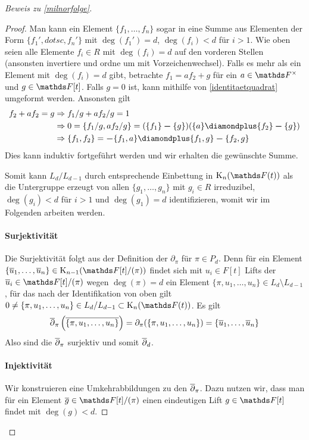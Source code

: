 \documentclass[ngerman,fontsize=11pt, paper=a4, parskip=half, titlepage=true, toc=bib]{scrartcl}
\begin{document}
\begin{proof}[Beweis zu \ref{milnorfolge}]
\begin{proof}
    Man kann ein Element $\{f_1,\dotsc,f_n\}$ sogar in eine Summe
    aus Elementen der Form $\{f_1',dotsc,f_n'\}$ mit $\deg(f_1')=d$,
    $\deg(f_i)<d$ für $i>1$.
    Wie oben seien alle Elemente $f_i\in R$ mit $\deg(f_i)=d$ auf den
    vorderen Stellen (ansonsten invertiere und ordne um mit
    Vorzeichenwechsel).
    Falls es mehr als ein Element mit $\deg(f_i)=d$ gibt, betrachte
    $f_1=a f_2 + g$ für ein $a\in\Fx$ und $g\in\F[t]$.
    Falls $g=0$ ist, kann mithilfe von \ref{identitaetquadrat}
    umgeformt werden.
    Ansonsten gilt
    \begin{align*}
      f_2+af_2=g 
      &\Rightarrow f_1/g+af_2/g=1\\
      &\Rightarrow 0=\{f_1/g,
        af_2/g\}=(\{f_1\}\m\{g\})(\{a\}\p\{f_2\}\m\{g\})\\
      &\Rightarrow \{f_1,f_2\}=\m\{f_1,a\}\p\{f_1,g\}\m\{f_2,g\}
    \end{align*}
    Dies kann induktiv fortgeführt werden und wir erhalten die
    gewünschte Summe.

    Somit kann $L_d/L_{d-1}$ durch entsprechende Einbettung in $\KnFt$
    als die Untergruppe erzeugt von allen $\{g_1,\dotsc,g_n\}$ mit
    $g_i\in R$ irreduzibel, $\deg(g_i)< d$ für $i>1$ und $\deg(g_1)=d$
    identifizieren, womit wir im Folgenden arbeiten werden.

    \paragraph{Surjektivität}
    Die Surjektivität folgt aus der Definition der $\partial_{\pi}$
    für $\pi\in P_d$.
    Denn für ein Element $\{\ov u_1,\dotsc,\ov u_n\}\in\K_{n-1}(\Ftpi)$
    findet sich mit $u_i\in F[t]$ Lifts der $\ov u_i\in
    \Ftpi$ wegen $\deg(\pi)=d$ ein Element
    $\{\pi,u_1,\dotsc,u_n\}\in L_d\setminus L_{d-1}$,
    für das nach der Identifikation von oben gilt
    $0\neq \{\pi,u_1,\dotsc,u_n\}\in L_d/L_{d-1}\subset\KnFt$.
    Es gilt 
    \begin{gather*}
      \overline\partial_{\pi}\left( \overline{\{\pi,u_1,\dotsc,u_n\}} \right)=
      \partial_{\pi}(\{\pi,u_1,\dotsc,u_n\})=
      \{\overline u_1,\dotsc,\overline u_n\}
    \end{gather*}
    Also sind die $\overline \partial_\pi$ surjektiv und somit $\overline\partial_d$.
  
    
    \paragraph{Injektivität}
    Wir konstruieren eine Umkehrabbildungen zu den $\overline\partial_\pi$.
    Dazu nutzen wir, dass man für ein Element $\ov g\in\Ftpi$ einen
    eindeutigen Lift $g\in\F[t]$ findet mit $\deg(g)<d$.
    

\end{proof}
\end{proof}
\end{document}
